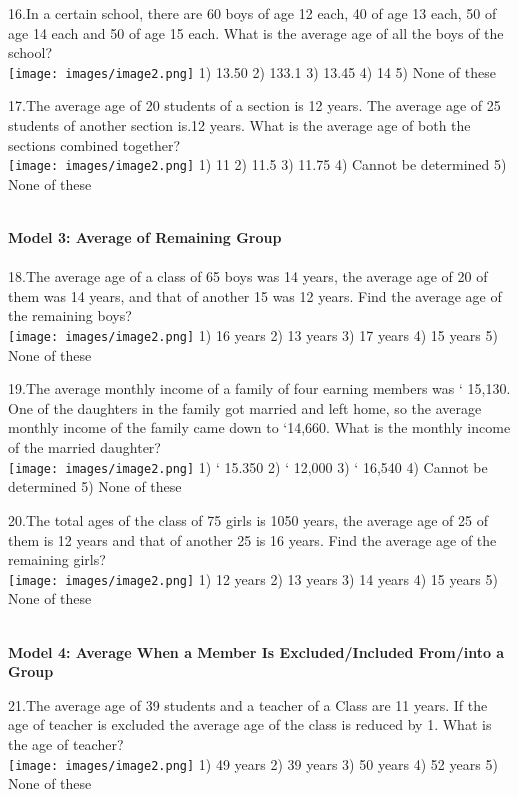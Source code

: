 \documentclass[
]{article}
\begin{document}
16.In a certain school, there are 60 boys of age 12 each, 40 of age 13 each, 50 of age 14 each and 50 of age 15 each. What is the average age of all the boys of the school?  \\
\texttt{[image: images/image2.png]}   1) 13.50 	2) 133.1 	3) 13.45 	4) 14 	5) None of these

17.The average age of 20 students of a section is 12 years. The average age of 25 students of another section is.12 years. What is the average age of both the sections combined together?  \\
\texttt{[image: images/image2.png]}   1) 11 2) 11.5 3) 11.75 4) Cannot be determined 5) None of these


\textbf{\\ Model 3: Average of Remaining Group \\}
\\ 18.The average age of a class of 65 boys was 14 years, the average age of 20 of them was 14 years, and that of another 15 was 12 years. Find the average age of the remaining boys?  \\
\texttt{[image: images/image2.png]}   1) 16 years 	2) 13 years 	3) 17 years 	4) 15 years 	5) None of these

19.The average monthly income of a family of four earning members was ` 15,130. One of the daughters in the family got married and left home, so the average monthly income of the family came down to `14,660. What is the monthly income of the married daughter?  \\
\texttt{[image: images/image2.png]}   1) ` 15.350 2) ` 12,000 3) ` 16,540 4) Cannot be determined 5) None of these

20.The total ages of the class of 75 girls is 1050 years, the average age of 25 of them is 12 years and that of another 25 is 16 years. Find the average age of the remaining girls?  \\
\texttt{[image: images/image2.png]}   1) 12 years 	2) 13 years 	3) 14 years 	4) 15 years 	5) None of these

\textbf{\\ Model 4: Average When a Member Is Excluded/Included From/into a Group \\}

21.The average age of 39 students and a teacher of a Class are 11 years. If the age of teacher is excluded the average age of the class is reduced by 1. What is the age of teacher?  \\
\texttt{[image: images/image2.png]}   	1) 49 years 	2) 39 years 	3) 50 years 	4) 52 years 	5) None of these
\end{document}
